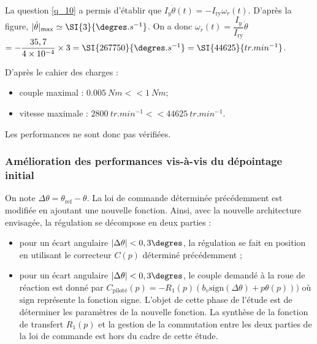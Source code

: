 \ifprof
\begin{corrige}
La question \ref{q_10} a permis d'établir que $I_y \dot{\theta}(t)=-I_{\text{ry}}\omega_r(t)$. D'après la figure, $| \dot{\theta}|_{\text{max}} \simeq \SI{3}{\degres.s^{-1}}$. 
On a donc $\omega_r(t) =  \dfrac{I_y}{I_{\text{ry}}} \dot{\theta}$ $=- \dfrac{35,7}{4\times 10^{-4}} \times 3 = \SI{267750}{\degres.s^{-1}} = \SI{44625}{tr.min^{-1}}$.
\end{corrige}
\else
\fi

\ifprof
\begin{corrige}
D'après le cahier des charges : 
\begin{itemize}
\item couple maximal : $\SI{0,005}{Nm} << \SI{1}{Nm}$;
\item vitesse maximale : $\SI{2800}{tr.min^{-1}} << \SI{44625}{tr.min^{-1}}$.
\end{itemize}

Les performances ne sont donc pas vérifiées.

\end{corrige}
\else
\fi

\subsubsection{\label{sec:3:D:2} Amélioration des performances vis-à-vis du dépointage initial}

\ifprof
\else

On note $\Delta \theta = \theta_{\text{ref}}-\theta$. La loi de commande déterminée précédemment est modifiée en ajoutant une nouvelle
fonction. Ainsi, avec la nouvelle architecture envisagée, la régulation se décompose en deux parties :
\begin{itemize}
\item pour un écart angulaire $|\Delta \theta|<0,3\degres$, la régulation se fait en position en utilisant le correcteur $C(p)$ déterminé
précédemment ;
\item pour un écart angulaire $|\Delta \theta|<0,3\degres$, le couple demandé à la roue de réaction est donné par $C_{\text{piloté}}(p)= -R_1(p)\left( b_v \text{sign}(\Delta \theta) + p\theta(p)\right))$ où $\text{sign}$ représente la fonction signe. L’objet de cette phase de l’étude est de
déterminer les paramètres de la nouvelle fonction. La synthèse de la fonction de transfert $R_1(p)$ et la gestion
de la commutation entre les deux parties de la loi de commande est hors du cadre de cette étude.
\end{itemize}
\fi


